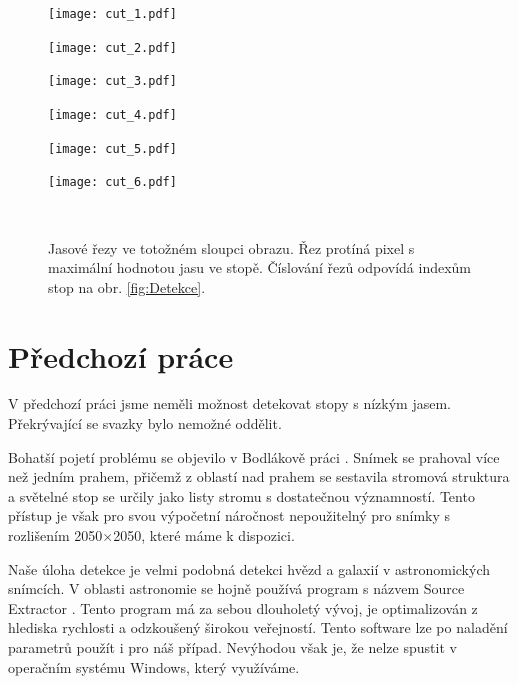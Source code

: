 \begin{figure}[htbp]
    \centering
    \begin{minipage}[c]{0.163\textwidth}
        \centering\texttt{[image: cut\_1.pdf]}
    \end{minipage}
    \begin{minipage}[c]{\xx \textwidth}
        \centering\texttt{[image: cut\_2.pdf]}
    \end{minipage}
    \begin{minipage}[c]{\xx \textwidth}
        \centering\texttt{[image: cut\_3.pdf]}
    \end{minipage}
    \begin{minipage}[c]{\xx \textwidth}
        \centering\texttt{[image: cut\_4.pdf]}
    \end{minipage}
    \begin{minipage}[c]{\xx \textwidth}
        \centering\texttt{[image: cut\_5.pdf]}
    \end{minipage}
    \begin{minipage}[c]{\xx \textwidth}
        \centering\texttt{[image: cut\_6.pdf]}
    \end{minipage}
    \\
        \caption[Jasové řezy.]{Jasové řezy ve totožném sloupci obrazu. Řez protíná pixel s maximální hodnotou jasu ve stopě. Číslování řezů odpovídá indexům stop na obr. \ref{fig:Detekce}.}
        \label{fig:rezy}
\end{figure}

\section{Předchozí práce}

V předchozí práci \cite{Drapela} jsme neměli možnost detekovat stopy s nízkým jasem. Překrývající se svazky bylo nemožné oddělit.  

Bohatší pojetí problému se objevilo v Bodlákově práci \cite{Bodlak2005}. Snímek se prahoval více než jedním prahem, přičemž z oblastí nad prahem se sestavila stromová struktura a světelné stop se určily jako listy stromu s dostatečnou významností. Tento přístup je však pro svou výpočetní náročnost nepoužitelný pro snímky s rozlišením 2050$\times$2050, které máme k dispozici. 

Naše úloha detekce je velmi podobná detekci hvězd a galaxií v astronomických snímcích. V oblasti astronomie se hojně používá program s názvem Source Extractor \cite{SEXarticle}. Tento program má za sebou dlouholetý vývoj, je optimalizován z hlediska rychlosti a odzkoušený širokou veřejností. Tento software lze po naladění parametrů použít i pro náš případ. Nevýhodou však je, že nelze spustit v operačním systému Windows, který využíváme.  

